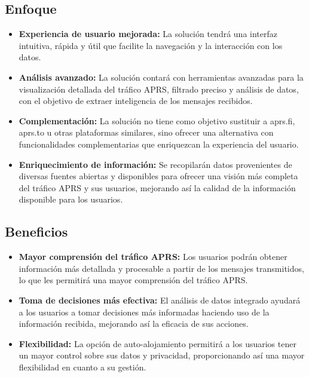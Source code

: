 \subsection{Enfoque}

\begin{itemize}
    \item \textbf{Experiencia de usuario mejorada:} La solución tendrá una interfaz intuitiva, rápida y útil que facilite la navegación y la interacción con los datos.
    
    \item \textbf{Análisis avanzado:} La solución contará con herramientas avanzadas para la visualización detallada del tráfico APRS, filtrado preciso y análisis de datos, con el objetivo de extraer inteligencia de los mensajes recibidos.
    
    \item \textbf{Complementación:} La solución no tiene como objetivo sustituir a aprs.fi, aprs.to u otras plataformas similares, sino ofrecer una alternativa con funcionalidades complementarias que enriquezcan la experiencia del usuario.
    
    \item \textbf{Enriquecimiento de información:} Se recopilarán datos provenientes de diversas fuentes abiertas y disponibles para ofrecer una visión más completa del tráfico APRS y sus usuarios, mejorando así la calidad de la información disponible para los usuarios.
\end{itemize}

\subsection{Beneficios}

\begin{itemize}
    \item \textbf{Mayor comprensión del tráfico APRS:} Los usuarios podrán obtener información más detallada y procesable a partir de los mensajes transmitidos, lo que les permitirá una mayor comprensión del tráfico APRS.
    
	\item \textbf{Toma de decisiones más efectiva:} El análisis de datos integrado ayudará a los usuarios a tomar decisiones más informadas haciendo uso de la información recibida, mejorando así la eficacia de sus acciones.
    
    \item \textbf{Flexibilidad:} La opción de auto-alojamiento permitirá a los usuarios tener un mayor control sobre sus datos y privacidad, proporcionando así una mayor flexibilidad en cuanto a su gestión.
\end{itemize}

